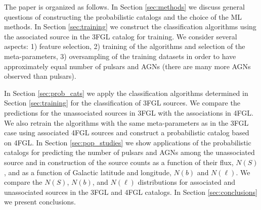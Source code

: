 The paper is organized as follows.
In Section \ref{sec:methods} we discuss general questions of constructing the probabilistic catalogs and the choice of the ML methods.
In Section \ref{sec:training} we construct the classification algorithms using the associated source in the 3FGL catalog for training. We consider several aspects: 1) feature selection, 2) training of the algorithms and selection of the meta-parameters,
3) oversampling of the training datasets in order to have approximately equal number of pulsars and AGNs (there are many more AGNs observed than pulsars).

In Section \ref{sec:prob_cats} we apply the classification algorithms determined in Section \ref{sec:training} for the classification of 3FGL sources.
We compare the predictions for the unassociated sources in 3FGL with the associations in 4FGL.
We also retrain the algorithms with the same meta-parameters as in the 3FGL case using associated 4FGL sources and construct
a probabilistic catalog based on 4FGL.
In Section \ref{sec:pop_studies} we show applications of the probabilistic catalogs for predicting the number of pulsars and AGNs among the unassociated source and in construction of the source counts as a function of their flux, $N(S)$, and as a function of 
Galactic latitude and longitude, $N(b)$ and $N(\ell)$.
We compare the $N(S)$, $N(b)$, and $N(\ell)$ distributions for associated and unassociated sources in the 3FGL and 4FGL catalogs.
In Section \ref{sec:conclusions} we present conclusions.


